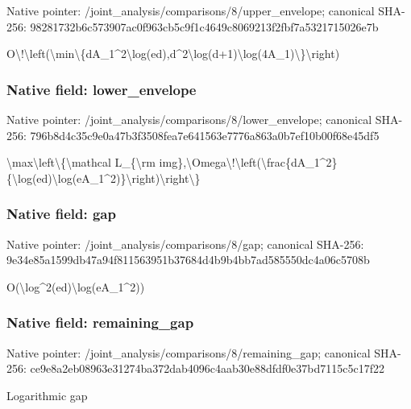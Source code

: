 \documentclass[10pt,a4paper]{article}
\begin{document}
Native pointer: /joint\_analysis/comparis\allowbreak{}ons/8/upper\_envelope; canonical SHA-256: 98281732b6c573907ac0f963\allowbreak{}cb5c9f1c4649c8069213f2fb\allowbreak{}f7a5321715026e7b


O\textbackslash{}!\textbackslash{}left(\textbackslash{}min\textbackslash{}\{dA\_1\textasciicircum{}2\textbackslash{}lo\allowbreak{}g(ed),d\textasciicircum{}2\textbackslash{}log(d+1)\textbackslash{}log(4\allowbreak{}A\_1)\textbackslash{}\}\textbackslash{}right)


\subsubsection{Native field: lower\_envelope}


Native pointer: /joint\_analysis/comparis\allowbreak{}ons/8/lower\_envelope; canonical SHA-256: 796b8d4c35c9e0a47b3f3508\allowbreak{}fea7e641563e7776a863a0b7\allowbreak{}ef10b00f68e45df5


\textbackslash{}max\textbackslash{}left\textbackslash{}\{\textbackslash{}mathcal L\_\{\textbackslash{}rm img\},\textbackslash{}Omega\textbackslash{}!\textbackslash{}left(\textbackslash{}frac\allowbreak{}\{dA\_1\textasciicircum{}2\}\{\textbackslash{}log(ed)\textbackslash{}log(eA\allowbreak{}\_1\textasciicircum{}2)\}\textbackslash{}right)\textbackslash{}right\textbackslash{}\}


\subsubsection{Native field: gap}


Native pointer: /joint\_analysis/comparisons/8/gap; canonical SHA-256: 9e34e85a1599db47a94f8115\allowbreak{}63951b37684d4b9b4bb7ad58\allowbreak{}5550dc4a06c5708b


O(\textbackslash{}log\textasciicircum{}2(ed)\textbackslash{}log(eA\_1\textasciicircum{}2))


\subsubsection{Native field: remaining\_gap}


Native pointer: /joint\_analysis/comparis\allowbreak{}ons/8/remaining\_gap; canonical SHA-256: ce9e8a2eb08963e31274ba37\allowbreak{}2dab4096c4aab30e88dfdf0e\allowbreak{}37bd7115c5c17f22


Logarithmic gap
\end{document}
